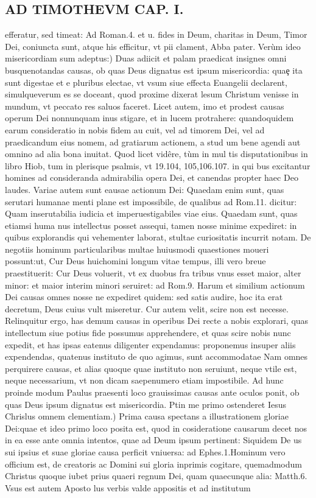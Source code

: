 \documentclass{article}
\begin{document}
\begin{pages}
\section*{AD TIMOTHEVM CAP. I. }
\marginpar{[ p.54 ]}
\marginpar{[ p.55 ]}\pstart efferatur, sed timeat: Ad Roman.4. et u. fides in Deum, charitas in Deum, Timor Dei, coniuncta sunt, atque  his efficitur, vt pii clament, Abba pater.  \pend\pstart Verùm ideo misericordiam sum adeptus:) Duas adiicit et palam praedicat insignes omni busquenotandas causas, ob quas Deus dignatus est ipsum misericordia: quaȩ ita sunt digestae et e pluribus electae, vt vsum siue effecta Euangelii declarent, simulqueverum es se doceant, quod proxime dixerat lesum Christum venisse in mundum, vt peccato res saluos faceret. Licet autem, imo et prodest causas operum Dei nonnunquam inus stigare, et in lucem protrahere: quandoquidem earum consideratio in nobis fidem au cuit, vel ad timorem Dei, vel ad praedicandum eius nomem, ad gratiarum actionem, a stud um bene agendi aut omnino ad alia bona inuitat. Quod licet vidêre, tùm in mul tis disputationibus  in libro Hiob, tum in plerisque  psalmis, vt 19.104, 105,106.107. in qui bus excitantur homines ad consideranda admirabilia opera Dei, et canendas propter haec Deo laudes. Variae autem sunt eausae actionum Dei: Quaedam enim sunt, quas serutari humanae menti plane est impossibile, de qualibus ad Rom.11. dicitur: Quam inserutabilia iudicia et imperuestigabiles viae eius. Quaedam sunt, quas etiamsi huma nus intellectus posset assequi, tamen nosse minime expediret: in quibus explorandis qui vehementer laborat, stultae curiositatis incurrit notam. De negotiis hominum particularibus multae huiusmodi quaestiones moueri possunt:ut, Cur Deus huichomini longum vitae tempus, illi vero breue praestituerit: Cur Deus voluerit, vt ex duobus fra tribus vnus esset maior, alter minor: et maior interim minori seruiret: ad Rom.9. Harum et similium actionum Dei causas omnes nosse ne expediret quidem: sed satis audire, hoc ita erat decretum, Deus cuius vult miseretur. Cur autem velit, scire non est necesse. Relinquitur ergo, has demum causas in operibus Dei recte a nobis explorari, quas intellectum siue potius fide possumus apprehendere, et quas scire nobis nunc expedit, et has ipsas eatenus diligenter expendamus: proponemus insuper aliis expendendas, quatenus instituto de quo agimus, sunt accommodatae Nam omnes perquirere causas, et alias quoque  quae instituto non seruiunt, neque  vtile est, neque  necessarium, vt non dicam saepenumero etiam impostibile. Ad hunc proinde modum Paulus praesenti loco grauissimas causas ante oculos ponit, ob quas Deus ipsum dignatus est misericordia.  \pend\pstart Ptin me primo ostenderet Iesus Chrislus omnem clementiam.) Prima causa spectans a illustrationem gloriae Dei:quae et ideo primo loco posita est, quod in cosideratione causarum decet nos in ea esse ante omnia intentos, quae ad Deum ipsum pertinent: Siquidem De us sui ipsius et suae gloriae causa perficit vniuersa: ad Ephes.1.Hominum vero officium est, de creatoris ac Domini sui gloria inprimis cogitare, quemadmodum Christus quoque  iubet prius quaeri regnum Dei, quam quaecunque  alia: Matth.6. Vsus est autem Aposto lus verbis valde appositis et ad institutum 
\end{pages}
\end{document}
